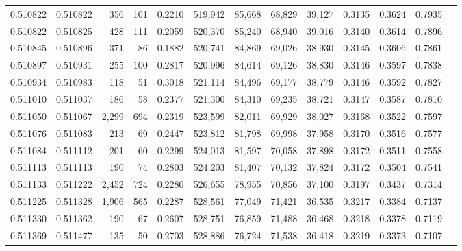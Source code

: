 \begin{tabular}{rrrrrrrrrrrrr}
0.510822 & 0.510822 &   356 &   101 &                                     0.2210 & 519,942 &  85,668 &  68,829 &  39,127 & 0.3135 & 0.3624 & 0.7935 \\
0.510822 & 0.510825 &   428 &   111 &                                     0.2059 & 520,370 &  85,240 &  68,940 &  39,016 & 0.3140 & 0.3614 & 0.7896 \\
0.510845 & 0.510896 &   371 &    86 &                                     0.1882 & 520,741 &  84,869 &  69,026 &  38,930 & 0.3145 & 0.3606 & 0.7861 \\
0.510897 & 0.510931 &   255 &   100 &                                     0.2817 & 520,996 &  84,614 &  69,126 &  38,830 & 0.3146 & 0.3597 & 0.7838 \\
0.510934 & 0.510983 &   118 &    51 &                                     0.3018 & 521,114 &  84,496 &  69,177 &  38,779 & 0.3146 & 0.3592 & 0.7827 \\
0.511010 & 0.511037 &   186 &    58 &                                     0.2377 & 521,300 &  84,310 &  69,235 &  38,721 & 0.3147 & 0.3587 & 0.7810 \\
0.511050 & 0.511067 & 2,299 &   694 &                                     0.2319 & 523,599 &  82,011 &  69,929 &  38,027 & 0.3168 & 0.3522 & 0.7597 \\
0.511076 & 0.511083 &   213 &    69 &                                     0.2447 & 523,812 &  81,798 &  69,998 &  37,958 & 0.3170 & 0.3516 & 0.7577 \\
0.511084 & 0.511112 &   201 &    60 &                                     0.2299 & 524,013 &  81,597 &  70,058 &  37,898 & 0.3172 & 0.3511 & 0.7558 \\
0.511113 & 0.511113 &   190 &    74 &                                     0.2803 & 524,203 &  81,407 &  70,132 &  37,824 & 0.3172 & 0.3504 & 0.7541 \\
0.511133 & 0.511222 & 2,452 &   724 &                                     0.2280 & 526,655 &  78,955 &  70,856 &  37,100 & 0.3197 & 0.3437 & 0.7314 \\
0.511225 & 0.511328 & 1,906 &   565 &                                     0.2287 & 528,561 &  77,049 &  71,421 &  36,535 & 0.3217 & 0.3384 & 0.7137 \\
0.511330 & 0.511362 &   190 &    67 &                                     0.2607 & 528,751 &  76,859 &  71,488 &  36,468 & 0.3218 & 0.3378 & 0.7119 \\
0.511369 & 0.511477 &   135 &    50 &                                     0.2703 & 528,886 &  76,724 &  71,538 &  36,418 & 0.3219 & 0.3373 & 0.7107 \\

\end{tabular}
